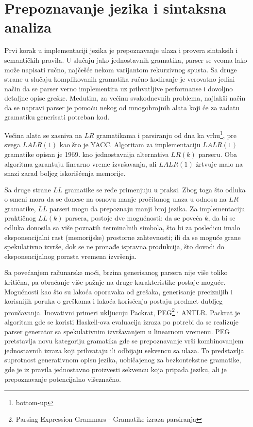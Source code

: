 \chapter{Prepoznavanje jezika i sintaksna analiza}
\label{ch:prepoznavanje}

Prvi korak u implementaciji jezika je prepoznavanje ulaza i provera sintaksih i semantičkih pravila. 
U slučaju jako jednostavnih gramatika, parser se veoma lako može napisati ručno, najčešće nekom varijantom rekurzivnog spusta. 
Sa druge strane u slučaju komplikovanih gramatika ručno kodiranje je verovatno jedini način da se parser verno implementira uz prihvatljive performanse i dovoljno detaljne opise greške.
Međutim, za većinu svakodnevnih problema, najlakši način da se napravi parser je pomoću nekog od mnogobrojnih alata koji će za zadatu gramatiku generisati potreban kod. 

Većina alata se zasniva na $LR$\cite{lr} gramatikama i parsiranju od dna ka vrhu\footnote{\eng bottom-up}, pre svega $LALR(1)$ kao što je YACC\cite{yacc}.
Algoritam za implementaciju $LALR(1)$ gramatike opisan je 1969. kao jednostavnija alternativa $LR(k)$ parseru.
Oba algoritma garantuju linearno vreme izvršavanja, ali $LALR(1)$ žrtvuje malo na snazi zarad boljeg iskorišćenja memorije.

Sa druge strane $LL$ gramatike se ređe primenjuju u praksi.
Zbog toga što odluka o smeni mora da se donese na osnovu manje pročitanog ulaza u odnosu na $LR$ gramatike, $LL$ parseri mogu da prepoznaju manji broj jezika.
Za implementaciju praktičnog $LL(k)$ parsera, postoje dve mogućnosti: da se poveća $k$, da bi se odluka donosila sa više poznatih terminalnih simbola, što bi za posledicu imalo eksponencijalni rast (memorijske) prostorne zahtevnosti; ili da se moguće grane spekulativno izvrše, dok se ne pronađe ispravna produkcija, što dovodi do eksponencijalnog porasta vremena izvršenja.

Sa povećanjem računarske moći, brzina generisanog parsera nije više toliko kritična, pa obraćanje više pažnje na druge karakteristike postaje moguće.
Mogućnosti kao što su lakoća oporavaka od grešaka, generisanje preciznijih i korisnijih poruka o greškama i lakoća korisćenja postaju predmet dubljeg proučavanja.
Inovativni primeri ukljucuju Packrat\cite{packrat}, PEG\cite{peg}\footnote{\skr \eng Parsing Expression Grammars - Gramatike izraza parsiranja} i ANTLR.
Packrat je algoritam gde se koristi Haskell-ova evaluacija izraza po potrebi da se realizuje parser generator sa spekulativnim izvršavanjem u linearnom vremenu.
PEG pretstavlja novu kategoriju gramatika gde se prepoznavanje vrši kombinovanjem jednostavnih izraza koji prihvataju ili odbijaju sekvencu sa ulaza.
To predstavlja suprotnost generativnom opisu jezika, uobičajenog za bezkontekstne gramatike, gde je iz pravila jednostavno proizvesti sekvencu koja pripada jeziku, ali je prepoznavanje potencijalno višeznačno.

